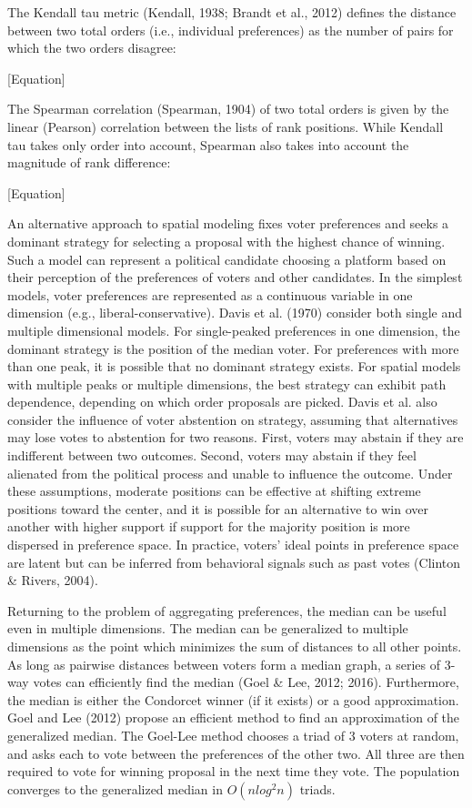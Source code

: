 The Kendall tau metric (Kendall, 1938; Brandt et al., 2012) defines the distance between two total orders (i.e., individual preferences) as the number of pairs for which the two orders disagree:

[Equation]

The Spearman correlation (Spearman, 1904) of two total orders is given by the linear (Pearson) correlation between the lists of rank positions. While Kendall tau takes only order into account, Spearman also takes into account the magnitude of rank difference:

[Equation]

An alternative approach to spatial modeling fixes voter preferences and seeks a dominant strategy for selecting a proposal with the highest chance of winning. Such a model can represent a political candidate choosing a platform based on their perception of the preferences of voters and other candidates. In the simplest models, voter preferences are represented as a continuous variable in one dimension (e.g., liberal-conservative). Davis et al. (1970) consider both single and multiple dimensional models. For single-peaked preferences in one dimension, the dominant strategy is the position of the median voter. For preferences with more than one peak, it is possible that no dominant strategy exists. For spatial models with multiple peaks or multiple dimensions, the best strategy can exhibit path dependence, depending on which order proposals are picked. Davis et al. also consider the influence of voter abstention on strategy, assuming that alternatives may lose votes to abstention for two reasons. First, voters may abstain if they are indifferent between two outcomes. Second, voters may abstain if they feel alienated from the political process and unable to influence the outcome. Under these assumptions, moderate positions can be effective at shifting extreme positions toward the center, and it is possible for an alternative to win over another with higher support if support for the majority position is more dispersed in preference space. In practice, voters' ideal points in preference space are latent but can be inferred from behavioral signals such as past votes (Clinton \& Rivers, 2004).

Returning to the problem of aggregating preferences, the median can be useful even in multiple dimensions. The median can be generalized to multiple dimensions as the point which minimizes the sum of distances to all other points. As long as pairwise distances between voters form a median graph, a series of 3-way votes can efficiently find the median (Goel \& Lee, 2012; 2016). Furthermore, the median is either the Condorcet winner (if it exists) or a good approximation. Goel and Lee (2012) propose an efficient method to find an approximation of the generalized median. The Goel-Lee method chooses a triad of 3 voters at random, and asks each to vote between the preferences of the other two. All three are then required to vote for winning proposal in the next time they vote. The population converges to the generalized median in $O(n log^2 n)$ triads.

